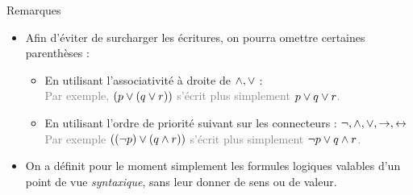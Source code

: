 \documentclass[10pt]{beamer}
\begin{document}
\begin{frame}{\Ctitle}{\stitle}
	\begin{block}{Remarques}
		\begin{itemize}
			\item Afin d'éviter de surcharger les écritures, on pourra omettre certaines parenthèses :
			      \begin{itemize}
				      \item<2-> En utilisant l'associativité à droite de $\wedge, \vee$ : \\
					      \onslide<3-> \textcolor{gray}{Par exemple, $(p \vee (q \vee r))$ s'écrit plus simplement $p \vee q \vee r$.}
				      \item<4-> En utilisant l'ordre de priorité suivant sur les connecteurs : $\neg, \wedge, \vee, \to, \leftrightarrow$ \\
					      \onslide<5-> \textcolor{gray}{Par exemple $ ((\neg p) \vee (q \wedge r))$ s'écrit plus simplement $\neg p \vee q \wedge r$.}
			      \end{itemize}
			\item<7-> On a définit pour le moment simplement les formules logiques valables d'un point de vue \textit{syntaxique}, sans leur donner de sens ou de valeur.
		\end{itemize}
	\end{block}
\end{frame}
\end{document}
